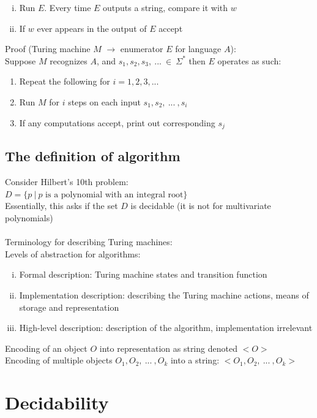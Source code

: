 \documentclass{article}
\newcommand*{\<}{\langle}
\renewcommand*{\>}{\rangle}
\begin{document}
			\begin{enumerate}[(i)]
			 	\item Run $E$. Every time $E$ outputs a string, compare it with $w$
			 	\item If $w$ ever appears in the output of $E$ accept
			 	\end{enumerate}
			Proof (Turing machine $M$ $\to$ enumerator $E$ for language $A$): \\
			Suppose $M$ recognizes $A$, and $s_1, s_2, s_3,\:...\:\in\:\Sigma^*$ then $E$ operates as such:
			\begin{enumerate}
				\item Repeat the following for $i = 1, 2, 3,...$
				\item Run $M$ for $i$ steps on each input $s_1, s_2,\:...\:, s_i$ 
				\item If any computations accept, print out corresponding $s_j$ \\
				\end{enumerate}
		\subsection{The definition of algorithm}
			Consider Hilbert's 10th problem: $D = \{p\:|\:p\text{ is a polynomial with an integral root}\}$ \\
			Essentially, this asks if the set $D$ is decidable (it is not for multivariate polynomials) \\
			\\
			Terminology for describing Turing machines: \\
			Levels of abstraction for algorithms:
			\begin{enumerate}[(i)]
				\item Formal description: Turing machine states and transition function
				\item Implementation description: describing the Turing machine actions, means of storage and representation
				\item High-level description: description of the algorithm, implementation irrelevant
				\end{enumerate}
			Encoding of an object $O$ into representation as string denoted $<O>$ \\
			Encoding of multiple objects $O_1, O_2,\:...\:, O_k$ into a string: $<O_1, O_2,\:...\:, O_k>$
		\clearpage

	\section{Decidability}
\end{document}

